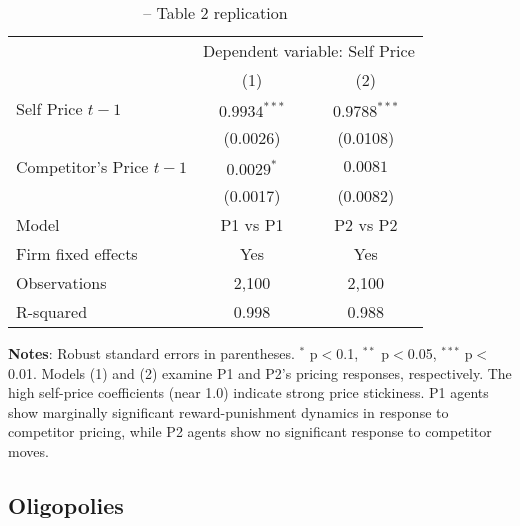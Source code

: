 \begin{table}[H]
    \centering
    \caption{\textcite[p. 18]{fish_algorithmic_2025} -- Table 2 replication}
    \label{tab:fe_fish}
    \begin{threeparttable}
    {\small
    \begin{tabular}{lcc}
    \toprule
    & \multicolumn{2}{c}{Dependent variable: Self Price} \\
    \cmidrule(lr){2-3}
    & (1) & (2) \\
    \midrule
    Self Price $t-1$                      & $0.9934^{***}$ & $0.9788^{***}$ \\
                                         & (0.0026)       & (0.0108)       \\
    Competitor's Price $t-1$             & $0.0029^{*}$   & $0.0081$       \\
                                         & (0.0017)       & (0.0082)       \\
    \midrule
    Model                                & P1 vs P1       & P2 vs P2       \\          
    Firm fixed effects                   & Yes            & Yes            \\
    \midrule
    Observations                         & 2,100          & 2,100          \\
    R-squared                           & 0.998          & 0.988          \\
    \bottomrule
    \end{tabular}
    }
    \begin{tablenotes}[flushleft]
    \footnotesize
    \item \textbf{Notes}: Robust standard errors in parentheses. $^{*}$ p$<$0.1, $^{**}$ p$<$0.05, $^{***}$ p$<$0.01. Models (1) and (2) examine P1 and P2's pricing responses, respectively. The high self-price coefficients (near 1.0) indicate strong price stickiness. P1 agents show marginally significant reward-punishment dynamics in response to competitor pricing, while P2 agents show no significant response to competitor moves.
    \end{tablenotes}
    \end{threeparttable}
\end{table}


\subsection*{Oligopolies}

